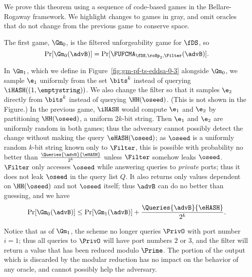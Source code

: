 	We prove this theorem using a sequence of code-based games in the Bellare-Rogaway framework.
	We highlight changes to games in gray, and omit oracles that do not change from the previous game to conserve space.
	
	The first game, $\Gm_0$, is the filtered unforgeability game for $\fDS$, so 
		\[\Pr[\Gm_0(\advB)] = \Pr[\FUFCMA_{\fDS,\roSp_2,\Filter}(\advB)].\]

	In $\Gm_1$, which we define in Figure~\ref{fig:gm-pf-ts-eddsa-0-3} alongside $\Gm_0$, we sample $\e_1$  uniformly from the set $\bits^{k}$ instead of querying $\iHASH((1,\emptystring))$.
	We also change the filter so that it samples $\e_2$ directly from $\bits^{k}$ instead of querying $\HH(\oseed)$. (This is not shown in the Figure.)
	In the previous game, $\iHASH$ would compute $\e_1$ and $\e_2$ by partitioning $\HH(\oseed)$, a uniform $2k$-bit string.
	Then $\e_1$ and $\e_2$ are uniformly random in both games; thus the adversary cannot possibly detect the change without making the query $\eHASH(\oseed)$; as $\oseed$ is a uniformly random $k$-bit string known only to $\Filter$, this is possible with probability no better than $\frac{\Queries{\advB}{\eHASH}}{2^{k}}$ unless $\Filter$ somehow leaks $\oseed$. 
	$\Filter$ only accesses $\oseed$ while answering queries to \emph{private} ports; thus it does not leak $\oseed$ in the query list $Q$. 
	It also returns only values dependent on $\HH(\oseed)$ and not $\oseed$ itself; thus $\advB$ can do no better than guessing, and we have	
	\[\Pr[\Gm_0(\advB)] \leq  \Pr[\Gm_1(\advB)] + \frac{\Queries{\advB}{\eHASH}}{2^{k}}.\]
	
	Notice that as of $\Gm_1$, the scheme no longer queries $\PrivO$ with port number $i=1$; thus all queries to $\PrivO$ will have port numbers $2$ or $3$, and the filter will return a value that has been reduced modulo $\Prime$. 
	The portion of the output which is discarded by the modular reduction has no impact on the behavior of any oracle, and cannot possibly help the adversary.
	
